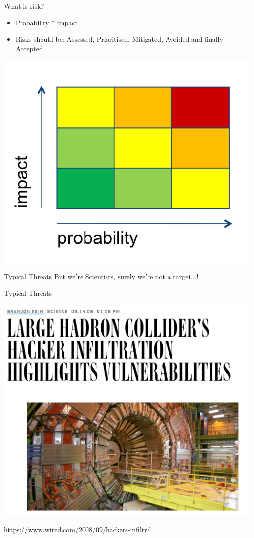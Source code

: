 \documentclass{beamer}
\begin{document}
\begin{frame}{What is risk?}
    \begin{itemize}
		\item Probability * impact
		\item Risks should be: Assessed, Prioritised, Mitigated, Avoided and finally Accepted
	\end{itemize}
    \begin{center} 
      \includegraphics[width=0.45\linewidth]{risk-matrix.png} 
    \end{center}
\end{frame}

\begin{frame}{Typical Threats}
\center 
But we're Scientists, surely we're not a target...! 
\end{frame}

\begin{frame}{Typical Threats}
  \begin{center}
		\includegraphics[width=0.65\linewidth]{lhc-attacked.png} \newline
        {\small \url{https://www.wired.com/2008/09/hackers-infiltr/} \par}
  \end{center}
\end{frame}
\end{document}
